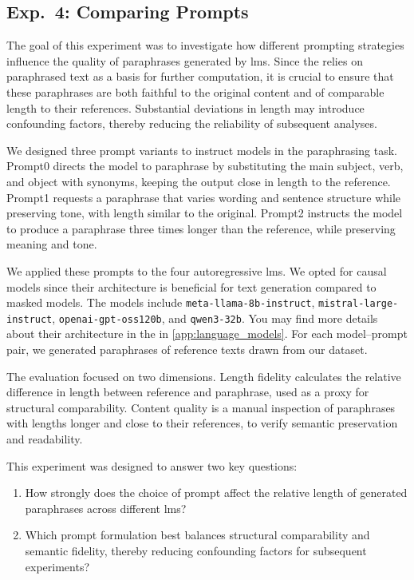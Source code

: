 \subsection{Exp.\ 4: Comparing Prompts}%
\label{subsec:prompt_impact}

The goal of this experiment was to investigate how different prompting strategies influence the quality of paraphrases generated by \acp{lm}.  
Since the \impAppr{} relies on paraphrased text as a basis for further computation, it is crucial to ensure that these paraphrases are both faithful to the original content and of comparable length to their references.  
Substantial deviations in length may introduce confounding factors, thereby reducing the reliability of subsequent analyses.  

We designed three prompt variants to instruct models in the paraphrasing task.
Prompt0 directs the model to paraphrase by substituting the main subject, verb, and object with synonyms, keeping the output close in length to the reference.  
Prompt1 requests a paraphrase that varies wording and sentence structure while preserving tone, with length similar to the original.  
Prompt2 instructs the model to produce a paraphrase three times longer than the reference, while preserving meaning and tone. 

We applied these prompts to the four autoregressive \acp{lm}. 
We opted for causal models since their architecture is beneficial for text generation compared to masked models.
The models include \texttt{meta-llama-8b-instruct}, \texttt{mistral-large-instruct}, \texttt{openai-gpt-\-oss\-120b}, and \texttt{qwen3-32b}.  
You may find more details about their architecture in the in \autoref{app:language_models}.
For each model–prompt pair, we generated paraphrases of reference texts drawn from our dataset.  


The evaluation focused on two dimensions.
Length fidelity calculates the relative difference in length between reference and paraphrase, used as a proxy for structural comparability.  
Content quality is a manual inspection of paraphrases with lengths longer and close to their references, to verify semantic preservation and readability.  

This experiment was designed to answer two key questions:  
\begin{enumerate}
    \item How strongly does the choice of prompt affect the relative length of generated paraphrases across different \acp{lm}?  
    \item Which prompt formulation best balances structural comparability and semantic fidelity, thereby reducing confounding factors for subsequent \imp{} experiments?  
\end{enumerate}
